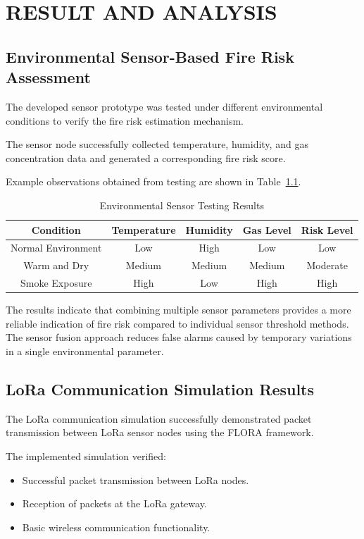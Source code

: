 \chapter{RESULT AND ANALYSIS}
\section{Environmental Sensor-Based Fire Risk Assessment}

The developed sensor prototype was tested under different environmental conditions
to verify the fire risk estimation mechanism.

The sensor node successfully collected temperature, humidity, and gas concentration
data and generated a corresponding fire risk score.

Example observations obtained from testing are shown in Table~\ref{tab:risk}.


\begin{table}[h]
\centering
\caption{Environmental Sensor Testing Results}
\label{tab:risk}
\begin{tabular}{|c|c|c|c|c|}
\hline
Condition & Temperature & Humidity & Gas Level & Risk Level\\
\hline
Normal Environment & Low & High & Low & Low\\
\hline
Warm and Dry & Medium & Medium & Medium & Moderate\\
\hline
Smoke Exposure & High & Low & High & High\\
\hline
\end{tabular}
\end{table}


The results indicate that combining multiple sensor parameters provides a more
reliable indication of fire risk compared to individual sensor threshold methods.
The sensor fusion approach reduces false alarms caused by temporary variations in
a single environmental parameter.

\section{LoRa Communication Simulation Results}

The LoRa communication simulation successfully demonstrated packet transmission
between LoRa sensor nodes using the FLORA framework.

The implemented simulation verified:

\begin{itemize}
    \item Successful packet transmission between LoRa nodes.
    \item Reception of packets at the LoRa gateway.
    \item Basic wireless communication functionality.
\end{itemize}


